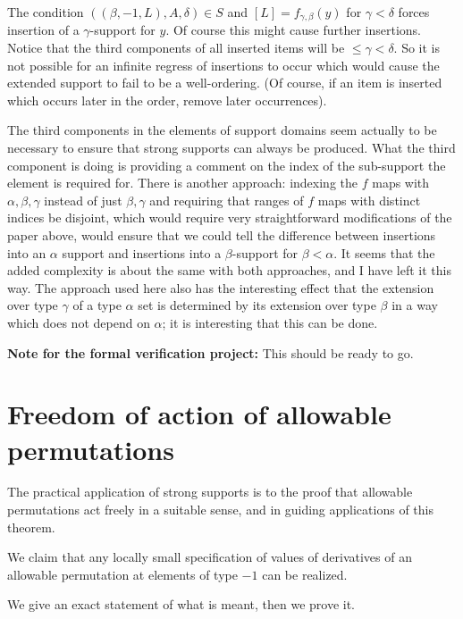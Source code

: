 \begin{description}
The condition $((\beta,-1,L),A,\delta) \in S$ and $[L]=f_{\gamma,\beta}(y)$ for $\gamma<\delta$ forces insertion of a $\gamma$-support for $y$.  Of course this might cause further insertions.  Notice that
the third components of all inserted items will be $\leq \gamma <\delta$.  So it is not possible for an infinite regress of insertions to occur which would cause the extended support to fail to be a well-ordering.  (Of course, if an item is inserted which occurs later in the order, remove later occurrences).

\end{description}

The third components in the elements of support domains seem actually to be necessary to ensure that strong supports can always be produced.  What the third component is doing is providing a comment on the index of the sub-support the element is required for.   There is another approach:  indexing the $f$ maps with $\alpha,\beta,\gamma$ instead of just $\beta,\gamma$ and requiring that ranges of $f$ maps with distinct indices be disjoint, which would require very straightforward modifications of the paper above, would ensure that we could tell the difference between insertions into an $\alpha$ support and insertions into a $\beta$-support for $\beta<\alpha$.  It seems that the added complexity is about the same with both approaches, and I have left it this way.  The approach used here also has the interesting effect that the extension over type $\gamma$ of a type $\alpha$ set is determined by its extension over type $\beta$ in a way which does not depend on $\alpha$;  it is interesting that this can be done.


{\bf Note for the formal verification project:}  This should be ready to go.
\newpage
\section{Freedom of action of allowable permutations}

The practical application of strong supports is to the proof that allowable permutations act freely in a suitable sense, and in guiding applications of this theorem.

We claim that any locally small specification of values of derivatives of an allowable permutation at elements of type $-1$ can be realized.

We give an exact statement of what is meant, then we prove it.


